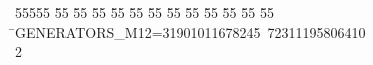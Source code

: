 %
%
\begin{tabbing}
55555 \= 55 \= 55 \= 55 \= 55 \= 55 \= 55 \= 55 \= 55 \= 55 \= 55 \= 55 \= 55 \= \>GENERATORS\_M12=31901011678245\ 72311195806410\\[0pt]
2\>\end{tabbing}
